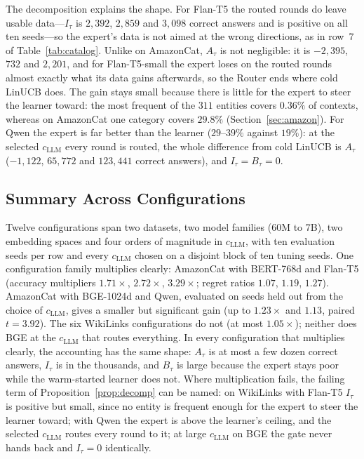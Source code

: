 \documentclass[anon]{alt2027} %
\begin{document}
The decomposition explains the shape. For Flan-T5 the routed rounds do leave
usable data---$I_\tau$ is $2{,}392$, $2{,}859$ and $3{,}098$ correct answers and is
positive on all ten seeds---so the expert's data is not aimed at the wrong
directions, as in row~7 of Table~\ref{tab:catalog}. Unlike on AmazonCat,
$A_\tau$ is not negligible: it is $-2{,}395$, $732$ and $2{,}201$, and for
Flan-T5-small the expert loses on the routed rounds almost exactly what its
data gains afterwards, so the Router ends where cold LinUCB does. The gain stays small
because there is little for the expert to steer the learner toward: the most
frequent of the $311$ entities covers $0.36\%$ of contexts, whereas on
AmazonCat one category covers $29.8\%$ (Section~\ref{sec:amazon}). For Qwen the expert is far better than the
learner ($29$--$39\%$ against $19\%$): at the selected $c_{\mathrm{LLM}}$ every round
is routed, the whole difference from cold LinUCB is $A_\tau$ ($-1{,}122$,
$65{,}772$ and $123{,}441$ correct answers), and $I_\tau=B_\tau=0$.

\subsection{Summary Across Configurations}
\label{app:summary}

Twelve configurations span two datasets, two model families (60M to 7B), two
embedding spaces and four orders of magnitude in $c_{\mathrm{LLM}}$, with ten evaluation
seeds per row and every $c_{\mathrm{LLM}}$ chosen on a disjoint block of ten tuning seeds. One configuration family
multiplies clearly: AmazonCat with BERT-768d and Flan-T5 (accuracy multipliers
$1.71\times$, $2.72\times$, $3.29\times$; regret ratios $1.07$, $1.19$,
$1.27$). AmazonCat with BGE-1024d and Qwen, evaluated on seeds held out from
the choice of $c_{\mathrm{LLM}}$, gives a smaller but significant gain (up to $1.23\times$ and
$1.13$, paired $t=3.92$). The six WikiLinks configurations do not (at most
$1.05\times$); neither does BGE at the $c_{\mathrm{LLM}}$ that routes everything. In every configuration
that multiplies clearly, the accounting has the same shape: $A_\tau$ is at most a few
dozen correct answers, $I_\tau$ is in the thousands, and $B_\tau$ is large because the expert stays poor while the
warm-started learner does not. Where multiplication fails, the failing term of
Proposition~\ref{prop:decomp} can be named: on WikiLinks with Flan-T5
$I_\tau$ is positive but small, since no entity is frequent enough for the
expert to steer the learner toward; with Qwen the expert is above the learner's
ceiling, and the selected $c_{\mathrm{LLM}}$ routes every round to it;
at large $c_{\mathrm{LLM}}$ on BGE the gate never hands back and $I_\tau=0$ identically.
\end{document}
